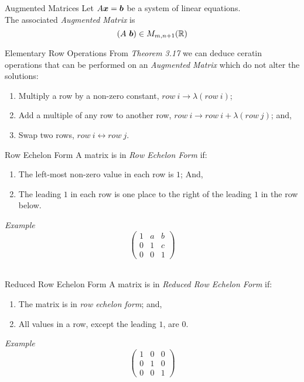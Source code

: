 \documentclass[11pt,a4paper]{article}
\begin{document}
\subtitle{Definition 3.18 - }{Augmented Matrices}
Let $A\boldsymbol{x} = \boldsymbol{b}$ be a system of linear equations.\\
The associated \textit{Augmented Matrix} is $$(A\ \boldsymbol{b}) \in M_{m, n+1}(\mathbb{R})$$

\subtitle{Theorem 3.19 - }{Elementary Row Operations}
From \textit{Theorem 3.17} we can deduce ceratin operations that can be performed on an \textit{Augmented Matrix} which do not alter the solutions:
\begin{enumerate}[label=\roman*)]
  \item Multiply a row by a non-zero constant, $row\ i \to \lambda(row\ i)$;
  \item Add a multiple of any row to another row, $row\ i \to row\ i + \lambda(row\ j)$; and,
  \item Swap two rows, $row\ i \leftrightarrow row\ j $.\\
\end{enumerate}

\subtitle{Definition 3.20 - }{Row Echelon Form}
A matrix is in \textit{Row Echelon Form} if:
\begin{enumerate}[label=\roman*)]
  \item The left-most non-zero value in each row is $1$; And,
  \item The leading $1$ in each row is one place to the right of the leading $1$ in the row below.
\end{enumerate}
\textit{Example} $$\begin{pmatrix}
  1 & a & b \\
  0 & 1 & c \\
  0 & 0 & 1
\end{pmatrix}$$ \\

\subtitle{Definition 3.20 - }{Reduced Row Echelon Form}
A matrix is in \textit{Reduced Row Echelon Form} if:
\begin{enumerate}[label=\roman*)]
  \item The matrix is in \textit{row echelon form}; and,
  \item All values in a row, except the leading $1$, are $0$.
\end{enumerate}
\textit{Example} $$\begin{pmatrix}
  1 & 0 & 0 \\
  0 & 1 & 0 \\
  0 & 0 & 1
\end{pmatrix}$$\\
\end{document}
